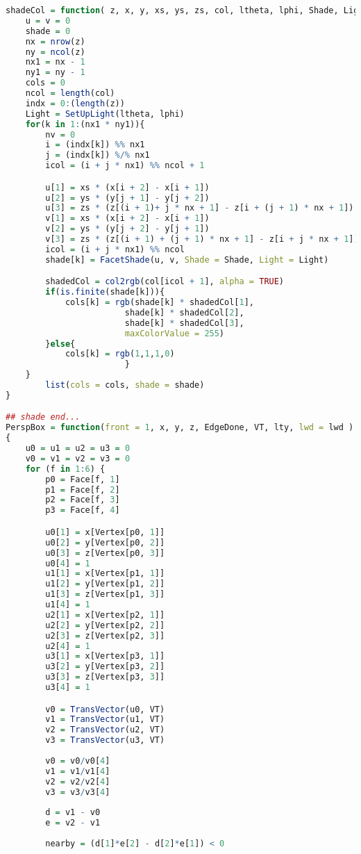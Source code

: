 \begin{lstlisting}[language = R]
shadeCol = function( z, x, y, xs, ys, zs, col, ltheta, lphi, Shade, Light) {
    u = v = 0
    shade = 0
    nx = nrow(z)
    ny = ncol(z)
    nx1 = nx - 1
    ny1 = ny - 1
    cols = 0
    ncol = length(col)
    indx = 0:(length(z))
    Light = SetUpLight(ltheta, lphi)
    for(k in 1:(nx1 * ny1)){
        nv = 0
        i = (indx[k]) %% nx1 
        j = (indx[k]) %/% nx1
        icol = (i + j * nx1) %% ncol + 1

        u[1] = xs * (x[i + 2] - x[i + 1])
        u[2] = ys * (y[j + 1] - y[j + 2])
        u[3] = zs * (z[(i + 1)+ j * nx + 1] - z[i + (j + 1) * nx + 1])
        v[1] = xs * (x[i + 2] - x[i + 1])
        v[2] = ys * (y[j + 2] - y[j + 1])
        v[3] = zs * (z[(i + 1) + (j + 1) * nx + 1] - z[i + j * nx + 1])
        icol = (i + j * nx1) %% ncol
        shade[k] = FacetShade(u, v, Shade = Shade, Light = Light)

        shadedCol = col2rgb(col[icol + 1], alpha = TRUE)
        if(is.finite(shade[k])){
            cols[k] = rgb(shade[k] * shadedCol[1], 
                        shade[k] * shadedCol[2], 
                        shade[k] * shadedCol[3], 
                        maxColorValue = 255)
        }else{
            cols[k] = rgb(1,1,1,0)
                        }
    }
        list(cols = cols, shade = shade)
}

## shade end...
PerspBox = function(front = 1, x, y, z, EdgeDone, VT, lty, lwd = lwd )
{
    u0 = u1 = u2 = u3 = 0
    v0 = v1 = v2 = v3 = 0
    for (f in 1:6) {
        p0 = Face[f, 1]
        p1 = Face[f, 2]
        p2 = Face[f, 3]
        p3 = Face[f, 4]

        u0[1] = x[Vertex[p0, 1]]
        u0[2] = y[Vertex[p0, 2]]
        u0[3] = z[Vertex[p0, 3]]
        u0[4] = 1
        u1[1] = x[Vertex[p1, 1]]
        u1[2] = y[Vertex[p1, 2]]
        u1[3] = z[Vertex[p1, 3]]
        u1[4] = 1
        u2[1] = x[Vertex[p2, 1]]
        u2[2] = y[Vertex[p2, 2]]
        u2[3] = z[Vertex[p2, 3]]
        u2[4] = 1
        u3[1] = x[Vertex[p3, 1]]
        u3[2] = y[Vertex[p3, 2]]
        u3[3] = z[Vertex[p3, 3]]
        u3[4] = 1

        v0 = TransVector(u0, VT)
        v1 = TransVector(u1, VT)
        v2 = TransVector(u2, VT)
        v3 = TransVector(u3, VT)
        
        v0 = v0/v0[4]
        v1 = v1/v1[4]
        v2 = v2/v2[4]
        v3 = v3/v3[4]
        
        d = v1 - v0
        e = v2 - v1
        
        nearby = (d[1]*e[2] - d[2]*e[1]) < 0
        

\end{lstlisting}
